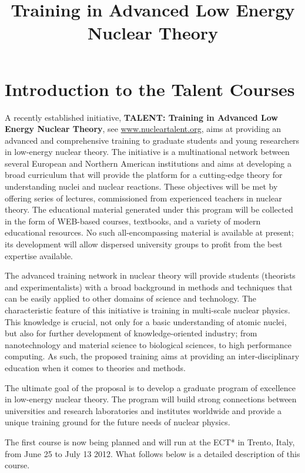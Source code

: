 \documentclass[prc,amsart,english]{revtex4}
\begin{document}
\title{Training in Advanced Low Energy Nuclear Theory}
\maketitle
\section{Introduction to the Talent Courses}
A recently established initiative, {\bf TALENT: Training in Advanced
Low Energy Nuclear Theory}, see \url{www.nucleartalent.org},  aims at
providing an advanced and comprehensive training to graduate students
and young researchers in low-energy nuclear theory. The initiative
is a multinational network between several European and Northern
American institutions and aims at developing a broad curriculum that
will provide the platform for a cutting-edge theory for understanding
nuclei and nuclear reactions. These objectives will be met by
offering series of lectures, commissioned from experienced teachers
in nuclear theory. The educational material generated under this
program will be collected in the form of WEB-based courses,
textbooks, and a variety of modern educational resources. No such
all-encompassing material is available at present; its development
will allow dispersed university groups to profit from the best
expertise available.

The advanced training network in nuclear theory will provide students (theorists and experimentalists) 
with a broad background in methods and techniques that can be easily applied to other domains of science and technology. The characteristic feature of this initiative is training in multi-scale nuclear physics. This knowledge is crucial, not only for a basic understanding of atomic nuclei, but also for further development of knowledge-oriented industry; from nanotechnology and material science to biological sciences, to high performance computing. As such, the proposed training aims at providing an inter-disciplinary education when it comes to theories and methods.

The ultimate goal of the proposal is to develop a graduate program of excellence in low-energy nuclear theory. The program will build strong connections between universities and research laboratories and institutes worldwide and provide a unique training ground for the future needs of nuclear physics.

The first course is now being planned and will run at the ECT* in Trento, Italy, from June 25 to July 13 2012. What follows below is a detailed description of this course.
\end{document}
